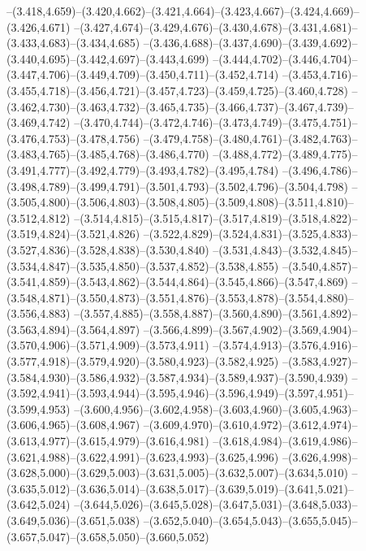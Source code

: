   --(3.418,4.659)--(3.420,4.662)--(3.421,4.664)--(3.423,4.667)--(3.424,4.669)--(3.426,4.671)%
  --(3.427,4.674)--(3.429,4.676)--(3.430,4.678)--(3.431,4.681)--(3.433,4.683)--(3.434,4.685)%
  --(3.436,4.688)--(3.437,4.690)--(3.439,4.692)--(3.440,4.695)--(3.442,4.697)--(3.443,4.699)%
  --(3.444,4.702)--(3.446,4.704)--(3.447,4.706)--(3.449,4.709)--(3.450,4.711)--(3.452,4.714)%
  --(3.453,4.716)--(3.455,4.718)--(3.456,4.721)--(3.457,4.723)--(3.459,4.725)--(3.460,4.728)%
  --(3.462,4.730)--(3.463,4.732)--(3.465,4.735)--(3.466,4.737)--(3.467,4.739)--(3.469,4.742)%
  --(3.470,4.744)--(3.472,4.746)--(3.473,4.749)--(3.475,4.751)--(3.476,4.753)--(3.478,4.756)%
  --(3.479,4.758)--(3.480,4.761)--(3.482,4.763)--(3.483,4.765)--(3.485,4.768)--(3.486,4.770)%
  --(3.488,4.772)--(3.489,4.775)--(3.491,4.777)--(3.492,4.779)--(3.493,4.782)--(3.495,4.784)%
  --(3.496,4.786)--(3.498,4.789)--(3.499,4.791)--(3.501,4.793)--(3.502,4.796)--(3.504,4.798)%
  --(3.505,4.800)--(3.506,4.803)--(3.508,4.805)--(3.509,4.808)--(3.511,4.810)--(3.512,4.812)%
  --(3.514,4.815)--(3.515,4.817)--(3.517,4.819)--(3.518,4.822)--(3.519,4.824)--(3.521,4.826)%
  --(3.522,4.829)--(3.524,4.831)--(3.525,4.833)--(3.527,4.836)--(3.528,4.838)--(3.530,4.840)%
  --(3.531,4.843)--(3.532,4.845)--(3.534,4.847)--(3.535,4.850)--(3.537,4.852)--(3.538,4.855)%
  --(3.540,4.857)--(3.541,4.859)--(3.543,4.862)--(3.544,4.864)--(3.545,4.866)--(3.547,4.869)%
  --(3.548,4.871)--(3.550,4.873)--(3.551,4.876)--(3.553,4.878)--(3.554,4.880)--(3.556,4.883)%
  --(3.557,4.885)--(3.558,4.887)--(3.560,4.890)--(3.561,4.892)--(3.563,4.894)--(3.564,4.897)%
  --(3.566,4.899)--(3.567,4.902)--(3.569,4.904)--(3.570,4.906)--(3.571,4.909)--(3.573,4.911)%
  --(3.574,4.913)--(3.576,4.916)--(3.577,4.918)--(3.579,4.920)--(3.580,4.923)--(3.582,4.925)%
  --(3.583,4.927)--(3.584,4.930)--(3.586,4.932)--(3.587,4.934)--(3.589,4.937)--(3.590,4.939)%
  --(3.592,4.941)--(3.593,4.944)--(3.595,4.946)--(3.596,4.949)--(3.597,4.951)--(3.599,4.953)%
  --(3.600,4.956)--(3.602,4.958)--(3.603,4.960)--(3.605,4.963)--(3.606,4.965)--(3.608,4.967)%
  --(3.609,4.970)--(3.610,4.972)--(3.612,4.974)--(3.613,4.977)--(3.615,4.979)--(3.616,4.981)%
  --(3.618,4.984)--(3.619,4.986)--(3.621,4.988)--(3.622,4.991)--(3.623,4.993)--(3.625,4.996)%
  --(3.626,4.998)--(3.628,5.000)--(3.629,5.003)--(3.631,5.005)--(3.632,5.007)--(3.634,5.010)%
  --(3.635,5.012)--(3.636,5.014)--(3.638,5.017)--(3.639,5.019)--(3.641,5.021)--(3.642,5.024)%
  --(3.644,5.026)--(3.645,5.028)--(3.647,5.031)--(3.648,5.033)--(3.649,5.036)--(3.651,5.038)%
  --(3.652,5.040)--(3.654,5.043)--(3.655,5.045)--(3.657,5.047)--(3.658,5.050)--(3.660,5.052)%
